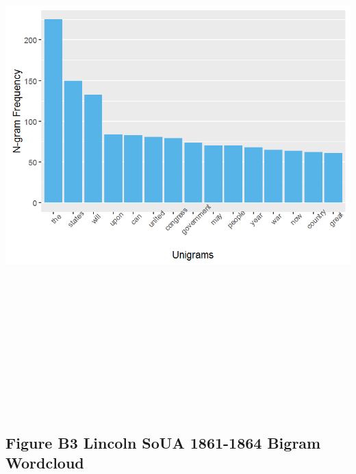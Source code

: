 \documentclass[]{article}
\begin{document}
\includegraphics[height=8.33333in]{images/Lincolndata_unigram_bar.png}

\newpage

\subsection{Figure B3 Lincoln SoUA 1861-1864 Bigram
Wordcloud}\label{figure-b3-lincoln-soua-1861-1864-bigram-wordcloud}
\end{document}
